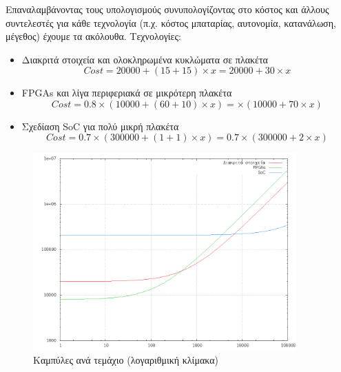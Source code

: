\documentclass[a4paper,10pt]{article}
\begin{document}
\subsubsection*{}
Επαναλαμβάνοντας τους υπολογισμούς συνυπολογίζοντας στο κόστος και άλλους
συντελεστές για κάθε τεχνολογία (π.χ. κόστος μπαταρίας, αυτονομία, 
κατανάλωση, μέγεθος) έχουμε τα ακόλουθα.
Τεχνολογίες:
\begin{itemize}
    \item Διακριτά στοιχεία και ολοκληρωμένα κυκλώματα σε πλακέτα
        \begin{equation}
            Cost=20000+(15+15)\times{x}=20000+30\times{x}
        \end{equation}
    \item FPGAs και λίγα περιφεριακά σε μικρότερη πλακέτα
        \begin{equation}
            Cost=0.8\times{(10000+(60+10)\times{x})}=\times{(10000+70\times{x})}
        \end{equation}
    \item Σχεδίαση SoC για πολύ μικρή πλακέτα
        \begin{equation}
            Cost=0.7\times{(300000+(1+1)\times{x})}=0.7\times{(300000+2\times{x})}
        \end{equation}
\end{itemize}

\begin{figure}[H] 
     \includegraphics[width=0.9\textwidth]{files/plot2.png}
     \caption{Καμπύλες ανά τεμάχιο (λογαριθμική κλίμακα)}
\end{figure}
\end{document}
